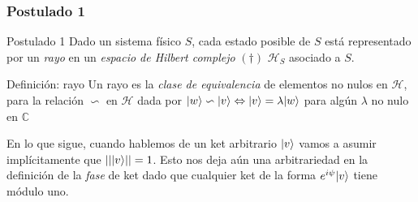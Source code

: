 \documentclass{beamer}
\begin{document}
\begin{frame}
    \frametitle{Postulado 1}
    
    \begin{block}{Postulado 1}
        Dado un sistema físico $S$, cada estado posible de $S$ está representado por un {\em rayo} en un {\em espacio de Hilbert complejo} $(\dagger)$ $\mathcal{H}_S$ asociado a $S$. 
    \end{block}
    
    \begin{block}{Definición: rayo}
        Un rayo es la {\em clase de equivalencia} de elementos no nulos en $\mathcal{H}$, para la relación $\backsim$ en $\mathcal{H}$ dada por
        $| w \rangle\backsim| v \rangle\Leftrightarrow | v \rangle=\lambda{| w \rangle}$ para algún $\lambda$ no nulo en $\mathbb{C}$
    \end{block}
    En lo que sigue, cuando hablemos de un ket arbitrario $| v \rangle$ vamos a asumir implícitamente que $||| v \rangle||=1$. Esto nos deja aún una arbitrariedad en la definición de la {\em fase} de ket dado que cualquier ket de la forma $e^{i\psi}| v \rangle$ tiene módulo uno.
    
    \end{frame} 
\end{document}
